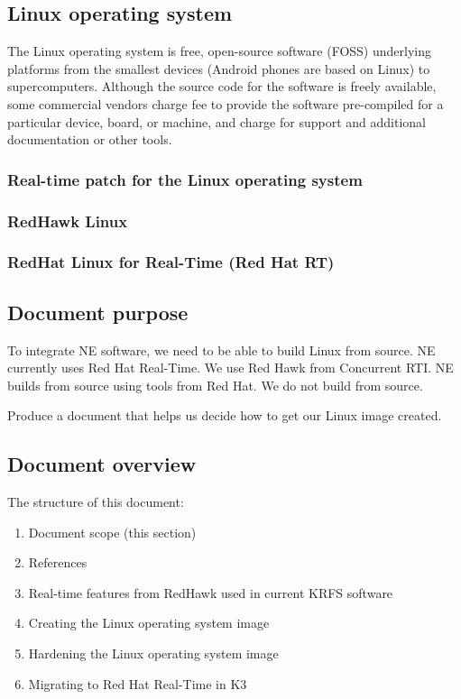\documentclass[12pt]{article}
\begin{document}
\subsection{Linux operating system}
The Linux operating system is free, open-source software (FOSS) underlying platforms from the smallest devices (Android phones are based on Linux) to supercomputers. Although the source code for the software is freely available, some commercial vendors charge fee to provide the software pre-compiled for a particular device, board, or machine, and charge for support and additional documentation or other tools.

\subsubsection{Real-time patch for the Linux operating system}



\subsubsection{RedHawk Linux}


\subsubsection{RedHat Linux for Real-Time (Red Hat RT)}


\subsection{Document purpose}
To integrate NE software, we need to be able to build Linux from source.  NE currently uses Red Hat Real-Time.  We use Red Hawk from Concurrent RTI.  NE builds from source using tools from Red Hat.  We do not build from source.

Produce a document that helps us decide how to get our Linux image created.


\subsection{Document overview}
The structure of this document:

\begin{enumerate}
    \item Document scope (this section)
    \item References
    \item Real-time features from RedHawk used in current KRFS software
    \item Creating the Linux operating system image
    \item Hardening the Linux operating system image
    \item Migrating to Red Hat Real-Time in K3
\end{enumerate}
\end{document}
